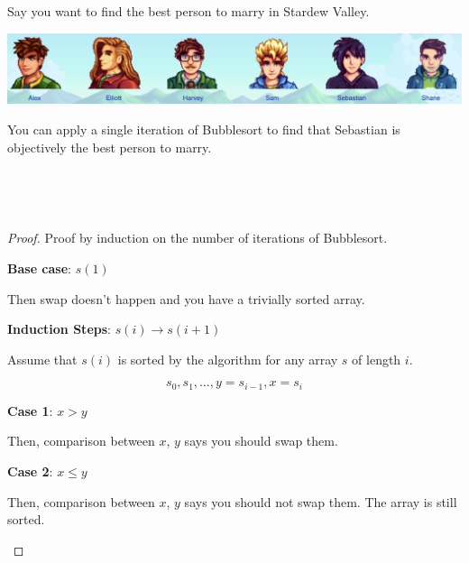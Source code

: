 \begin{example}
    Say you want to find the best person to marry in Stardew Valley. 

    \begin{center}
        \includegraphics[width=0.75\linewidth]{figures/Stardew Valley.png}
    \end{center}

    You can apply a single iteration of Bubblesort to find that Sebastian is objectively the best person to marry. 

    {~~~}

    \begin{algorithmic}[1]
                        \State {}
                    \EndIf
                \EndFor
            \EndFor
        \EndProcedure
    \end{algorithmic}

    {~~~}

    \begin{proof}
        Proof by induction on the number of iterations of Bubblesort.

        \begin{listu}
            \item \textbf{Base case}: $s(1)$
            
            Then swap doesn't happen and you have a trivially sorted array.

            \item \textbf{Induction Steps}: $s(i) \rightarrow s(i+1)$
            
            Assume that $s(i)$ is sorted by the algorithm for any array $s$ of length $i$. 

            \[
                s_0, s_1, \dots, y = s_{i-1}, x = s_i
            \]


            \begin{listo}
                \item \textbf{Case 1}: $x > y$
                
                Then, comparison between $x$, $y$ says you should swap them.

                \item \textbf{Case 2}: $x \le y$
                
                Then, comparison between $x$, $y$ says you should not swap them. The array is still sorted.
            \end{listo}
        \end{listu}
    \end{proof}
\end{example}

